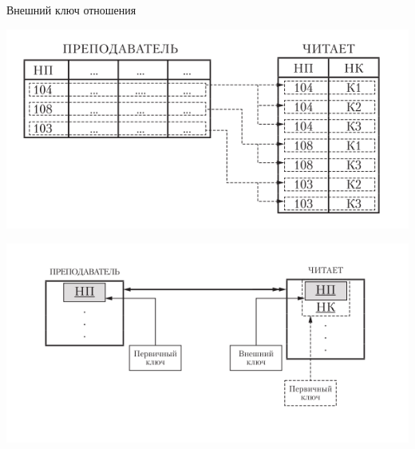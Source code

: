 \documentclass{beamer}
\begin{document}
\begin{frame}{Внешний ключ отношения}
\begin{center}
\includegraphics[scale=0.50]{images/rel-06.png}
\end{center}
\begin{center}
\includegraphics[scale=0.50]{images/rel-07.png}
\end{center}
\end{frame}
\end{document}
